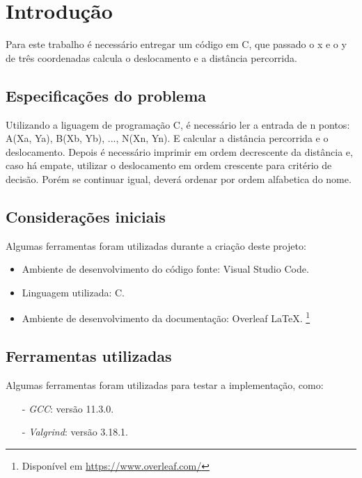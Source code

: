 \documentclass{article}
\begin{document}


\section{Introdução}
Para este trabalho é necessário entregar um código em C, que passado o x e o y de três coordenadas calcula o deslocamento e a distância percorrida. 

\subsection{Especificações do problema}
    {Utilizando a liguagem de programação C, é necessário ler a entrada de n pontos: A(Xa, Ya), B(Xb, Yb), ..., N(Xn, Yn). E calcular a distância percorrida e o deslocamento. Depois é necessário imprimir em ordem decrescente da distância e, caso há empate, utilizar o deslocamento em ordem crescente para critério de decisão. Porém se continuar igual, deverá ordenar por ordem alfabetica do nome.
    }

\subsection{Considerações iniciais}

    Algumas ferramentas foram utilizadas durante a criação deste projeto:
    
    \begin{itemize}
      \item Ambiente de desenvolvimento do código fonte: Visual Studio Code. 
      \item Linguagem utilizada: C.
      \item Ambiente de desenvolvimento da documentação: Overleaf \LaTeX. \footnote{Disponível em \url{https://www.overleaf.com/}}
    \end{itemize}

\subsection{Ferramentas utilizadas}
    Algumas ferramentas foram utilizadas para testar a implementação, como:
    \begin{itemize}
        \item[-] \textit{GCC}: versão 11.3.0.
        \item[-] \textit{Valgrind}: versão 3.18.1.
    \end{itemize}
\end{document}
